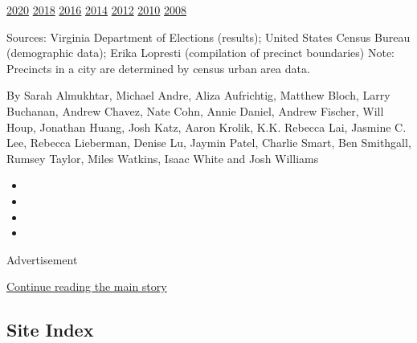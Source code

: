 \href{https://www.nytimes3xbfgragh.onion/interactive/2020/03/03/us/elections/results-virginia-president-democrat-primary-election.html?action=click\&module=ELEX_results\&pgtype=Interactive\&region=PastResultsFooter}{2020}
\href{https://www.nytimes3xbfgragh.onion/interactive/2018/11/06/us/elections/results-virginia-elections.html?action=click\&module=ELEX_results\&pgtype=Interactive\&region=PastResultsFooter}{2018}
\href{https://www.nytimes3xbfgragh.onion/elections/2016/results/virginia?action=click\&module=ELEX_results\&pgtype=Interactive\&region=PastResultsFooter}{2016}
\href{https://www.nytimes3xbfgragh.onion/elections/2014/virginia-elections?action=click\&module=ELEX_results\&pgtype=Interactive\&region=PastResultsFooter}{2014}
\href{https://www.nytimes3xbfgragh.onion/elections/2012/results/states/virginia.html?action=click\&module=ELEX_results\&pgtype=Interactive\&region=PastResultsFooter}{2012}
\href{https://www.nytimes3xbfgragh.onion/elections/2010/results/virginia.html?action=click\&module=ELEX_results\&pgtype=Interactive\&region=PastResultsFooter}{2010}
\href{https://www.nytimes3xbfgragh.onion/elections/2008/results/states/virginia.html?action=click\&module=ELEX_results\&pgtype=Interactive\&region=PastResultsFooter}{2008}

Sources: Virginia Department of Elections (results); United States
Census Bureau (demographic data); Erika Lopresti (compilation of
precinct boundaries) \textbar{} Note: Precincts in a city are determined
by census urban area data.

By Sarah Almukhtar, Michael Andre, Aliza Aufrichtig, Matthew Bloch,
Larry Buchanan, Andrew Chavez, Nate Cohn, Annie Daniel, Andrew Fischer,
Will Houp, Jonathan Huang, Josh Katz, Aaron Krolik, K.K. Rebecca Lai,
Jasmine C. Lee, Rebecca Lieberman, Denise Lu, Jaymin Patel, Charlie
Smart, Ben Smithgall, Rumsey Taylor, Miles Watkins, Isaac White and Josh
Williams

\begin{itemize}
\item
\item
\item
\item
\end{itemize}

Advertisement

\protect\hyperlink{after-bottom}{Continue reading the main story}

\hypertarget{site-index}{%
\subsection{Site Index}\label{site-index}}

